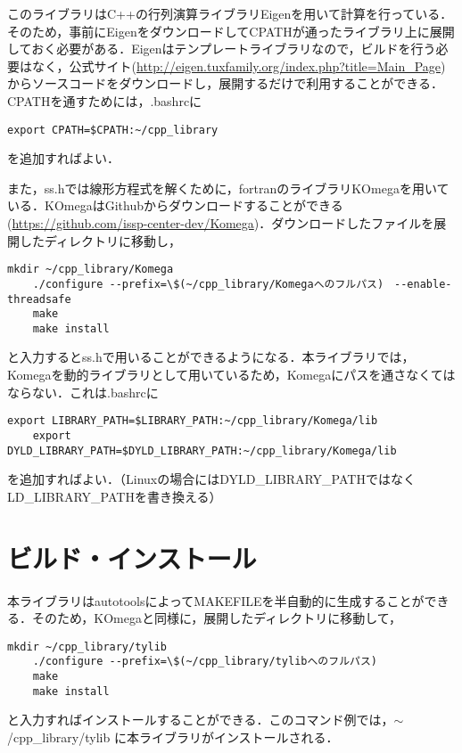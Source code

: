 \documentclass[report, 11pt, uplatex]{jsbook}
\begin{document}
	このライブラリはC++の行列演算ライブラリEigenを用いて計算を行っている．そのため，事前にEigenをダウンロードしてCPATHが通ったライブラリ上に展開しておく必要がある．Eigenはテンプレートライブラリなので，ビルドを行う必要はなく，公式サイト(\href{http://eigen.tuxfamily.org/index.php?title=Main\_Page}{http://eigen.tuxfamily.org/index.php?title=Main\_Page})からソースコードをダウンロードし，展開するだけで利用することができる．CPATHを通すためには，.bashrcに
	\begin{lstlisting}[basicstyle=\ttfamily\footnotesize, frame=single]
	export CPATH=$CPATH:~/cpp_library
	\end{lstlisting}
	を追加すればよい．

	また，ss.hでは線形方程式を解くために，fortranのライブラリKOmegaを用いている．KOmegaはGithubからダウンロードすることができる(\href{https://github.com/issp-center-dev/Komega}{https://github.com/issp-center-dev/Komega})．ダウンロードしたファイルを展開したディレクトリに移動し，
	
	\begin{lstlisting}[basicstyle=\ttfamily\footnotesize, frame=single]
	mkdir ~/cpp_library/Komega
	./configure --prefix=\$(~/cpp_library/Komegaへのフルパス)　--enable-threadsafe
	make
	make install
	\end{lstlisting}
	
	と入力するとss.hで用いることができるようになる．本ライブラリでは，Komegaを動的ライブラリとして用いているため，Komegaにパスを通さなくてはならない．これは.bashrcに
	
	\begin{lstlisting}[basicstyle=\ttfamily\footnotesize, frame=single]
	export LIBRARY_PATH=$LIBRARY_PATH:~/cpp_library/Komega/lib
	export DYLD_LIBRARY_PATH=$DYLD_LIBRARY_PATH:~/cpp_library/Komega/lib
	\end{lstlisting}
	を追加すればよい．（Linuxの場合にはDYLD\_LIBRARY\_PATHではなくLD\_LIBRARY\_PATHを書き換える）

	\chapter{ビルド・インストール}
	本ライブラリはautotoolsによってMAKEFILEを半自動的に生成することができる．そのため，KOmegaと同様に，展開したディレクトリに移動して，
	\begin{lstlisting}[basicstyle=\ttfamily\footnotesize, frame=single]
	mkdir ~/cpp_library/tylib
	./configure --prefix=\$(~/cpp_library/tylibへのフルパス)
	make
	make install
	\end{lstlisting}
	と入力すればインストールすることができる．このコマンド例では，$\sim$/cpp\_library/tylib に本ライブラリがインストールされる．
	
\end{document}
